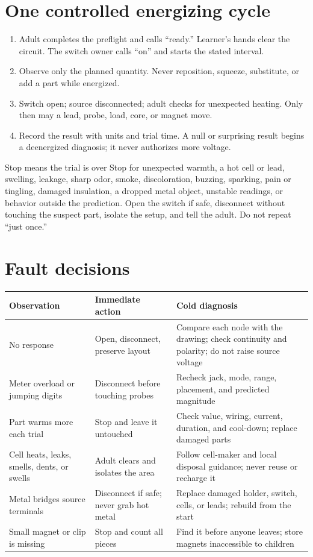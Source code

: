 \section{One controlled energizing cycle}

\begin{enumerate}
\item Adult completes the preflight and calls ``ready.'' Learner's hands clear
the circuit. The switch owner calls ``on'' and starts the stated interval.
\item Observe only the planned quantity. Never reposition, squeeze, substitute,
or add a part while energized.
\item Switch open; source disconnected; adult checks for unexpected heating.
Only then may a lead, probe, load, core, or magnet move.
\item Record the result with units and trial time. A null or surprising result
begins a deenergized diagnosis; it never authorizes more voltage.
\end{enumerate}

\begin{teloshazard}{Stop means the trial is over}
Stop for unexpected warmth, a hot cell or lead, swelling, leakage, sharp odor,
smoke, discoloration, buzzing, sparking, pain or tingling, damaged insulation,
a dropped metal object, unstable readings, or behavior outside the prediction.
Open the switch if safe, disconnect without touching the suspect part, isolate
the setup, and tell the adult. Do not repeat ``just once.''
\end{teloshazard}

\begingroup\small
\section{Fault decisions}

\begin{tabularx}{\linewidth}{@{}p{.25\linewidth}p{.30\linewidth}L@{}}
\toprule
\textbf{Observation} & \textbf{Immediate action} & \textbf{Cold diagnosis}\\
\midrule
No response & Open, disconnect, preserve layout & Compare each node with the
drawing; check continuity and polarity; do not raise source voltage\\
Meter overload or jumping digits & Disconnect before touching probes & Recheck
jack, mode, range, placement, and predicted magnitude\\
Part warms more each trial & Stop and leave it untouched & Check value, wiring,
current, duration, and cool-down; replace damaged parts\\
Cell heats, leaks, smells, dents, or swells & Adult clears and isolates the area
& Follow cell-maker and local disposal guidance; never reuse or recharge it\\
Metal bridges source terminals & Disconnect if safe; never grab hot metal &
Replace damaged holder, switch, cells, or leads; rebuild from the start\\
Small magnet or clip is missing & Stop and count all pieces & Find it before
anyone leaves; store magnets inaccessible to children\\
\bottomrule
\end{tabularx}

